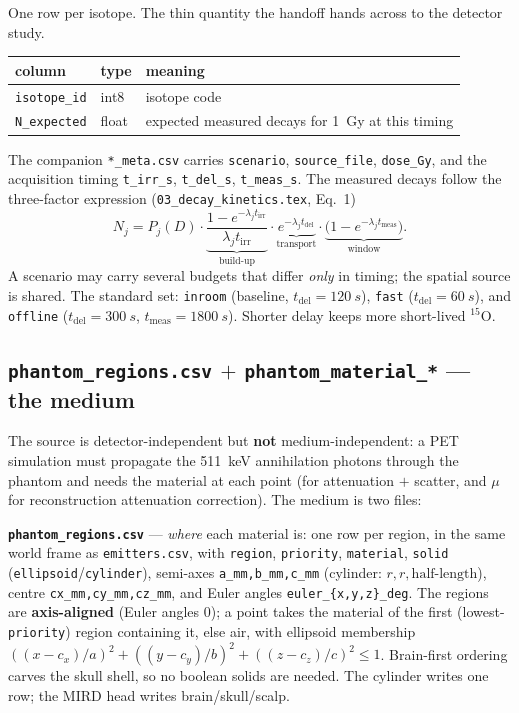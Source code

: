 \documentclass[11pt]{article}
\newcommand{\tirr}{t_{\mathrm{irr}}}
\newcommand{\tdel}{t_{\mathrm{del}}}
\newcommand{\tmeas}{t_{\mathrm{meas}}}
\newcommand{\file}[1]{\texttt{#1}}
\begin{document}
One row per isotope. The thin quantity the handoff hands across to the detector
study.

\begin{center}
\begin{tabular}{@{}lll@{}}
\toprule
column & type & meaning \\
\midrule
\file{isotope\_id} & int8 & isotope code \\
\file{N\_expected} & float & expected measured decays for \SI{1}{Gy} at this timing \\
\bottomrule
\end{tabular}
\end{center}

The companion \file{*\_meta.csv} carries \file{scenario}, \file{source\_file},
\file{dose\_Gy}, and the acquisition timing \file{t\_irr\_s}, \file{t\_del\_s},
\file{t\_meas\_s}. The measured decays follow the three-factor expression
(\file{03\_decay\_kinetics.tex}, Eq.~1)
\begin{equation}
  N_j = P_j(D)\cdot
        \underbrace{\frac{1-e^{-\lambda_j \tirr}}{\lambda_j \tirr}}_{\text{build-up}}\cdot
        \underbrace{e^{-\lambda_j \tdel}}_{\text{transport}}\cdot
        \underbrace{\bigl(1-e^{-\lambda_j \tmeas}\bigr)}_{\text{window}} .
  \label{eq:budget}
\end{equation}
A scenario may carry several budgets that differ \emph{only} in timing; the
spatial source is shared. The standard set: \file{inroom} (baseline,
$\tdel=\SI{120}{s}$), \file{fast} ($\tdel=\SI{60}{s}$), and \file{offline}
($\tdel=\SI{300}{s}$, $\tmeas=\SI{1800}{s}$). Shorter delay keeps more
short-lived $^{15}$O.

\subsection{\file{phantom\_regions.csv} $+$ \file{phantom\_material\_*} --- the medium}

The source is detector-independent but \textbf{not} medium-independent: a PET
simulation must propagate the \SI{511}{keV} annihilation photons through the
phantom and needs the material at each point (for attenuation $+$ scatter, and
$\mu$ for reconstruction attenuation correction). The medium is two files:

\textbf{\file{phantom\_regions.csv}} --- \emph{where} each material is: one row
per region, in the same world frame as \file{emitters.csv}, with
\file{region}, \file{priority}, \file{material}, \file{solid}
(\file{ellipsoid}/\file{cylinder}), semi-axes \file{a\_mm,b\_mm,c\_mm} (cylinder:
$r,r,\text{half-length}$), centre \file{cx\_mm,cy\_mm,cz\_mm}, and Euler angles
\file{euler\_\{x,y,z\}\_deg}. The regions are \textbf{axis-aligned} (Euler angles
$0$); a point takes the material of the first (lowest-\file{priority}) region
containing it, else air, with ellipsoid membership
$((x-c_x)/a)^2+((y-c_y)/b)^2+((z-c_z)/c)^2\le 1$. Brain-first ordering carves the
skull shell, so no boolean solids are needed. The cylinder writes one row; the
MIRD head writes brain/skull/scalp.
\end{document}
